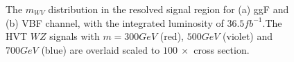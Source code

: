 \begin{figure}[h]
	\centering
	\caption{The $m_{WV}$ distribution in the resolved signal region for (a) ggF and (b) VBF channel, with the integrated luminosity of $36.5fb^{-1}$.The HVT $WZ$ signals with $m=300GeV$ (red), $500GeV$ (violet) and $700GeV$ (blue) are overlaid 
		scaled to $100 ~\times$ cross section.}
	\label{Fig:ResolvedSR}
\end{figure}
